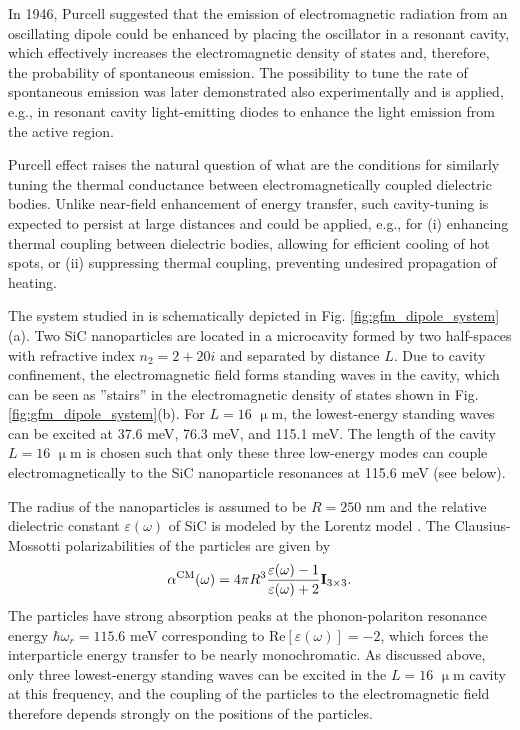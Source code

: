 In 1946, Purcell \cite{purcell46} suggested that the emission of electromagnetic radiation from an oscillating dipole could be enhanced by placing the oscillator in a resonant cavity, which effectively increases the electromagnetic density of states and, therefore, the probability of spontaneous emission. The possibility to tune the rate of spontaneous emission was later demonstrated also experimentally \cite{hulet85}\cite{martini87} and is applied, e.g., in resonant cavity light-emitting diodes \cite{schubert92} to enhance the light emission from the active region.

Purcell effect raises the natural question of what are the conditions for similarly tuning the thermal conductance between electromagnetically coupled dielectric bodies. Unlike near-field enhancement of energy transfer, such cavity-tuning is expected to persist at large distances and could be applied, e.g., for (i) enhancing thermal coupling between dielectric bodies, allowing for efficient cooling of hot spots, or (ii) suppressing thermal coupling, preventing undesired propagation of heating.

The system studied in  is schematically depicted in Fig. \ref{fig:gfm_dipole_system}(a). Two SiC nanoparticles are located in a microcavity formed by two half-spaces with refractive index $n_2=2+20i$ and separated by distance $L$. Due to cavity confinement, the electromagnetic field forms standing waves in the cavity, which can be seen as ''stairs'' in the electromagnetic density of states shown in Fig. \ref{fig:gfm_dipole_system}(b). For $L=16$ $\upmu$m, the lowest-energy standing waves can be excited at 37.6 meV, 76.3 meV, and 115.1 meV. The length of the cavity $L=16$ $\upmu$m is chosen such that only these three low-energy modes can couple electromagnetically to the SiC nanoparticle resonances at 115.6 meV (see below). 

The radius of the nanoparticles is assumed to be $R=250$ nm and the relative dielectric constant $\varepsilon(\omega)$ of SiC is modeled by the Lorentz model \cite{mulet01,spitzer59}. The Clausius-Mossotti polarizabilities of the particles are given by
\begin{equation}
 \alpha^{\textrm{CM}}(\omega)= 4 \pi R^3 \frac{\varepsilon(\omega)-1}{\varepsilon(\omega)+2} \mathbf{I}_{3 \times 3}.
\end{equation}
The particles have strong absorption peaks at the phonon-polariton resonance energy $\hbar \omega_r=115.6$ meV corresponding to $\textrm{Re}[\varepsilon(\omega)]=-2$, which forces the interparticle energy transfer to be nearly monochromatic. As discussed above, only three lowest-energy standing waves can be excited in the $L=16$ $\upmu$m cavity at this frequency, and the coupling of the particles to the electromagnetic field therefore depends strongly on the positions of the particles.  

